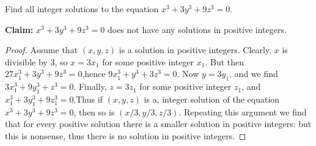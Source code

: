 \documentclass[11pt,dvipsnames]{book}
\numberwithin{equation}{section} %
\numberwithin{figure}{section} %
\numberwithin{table}{section} %
\begin{document}
\begin{exercise} Find all integer solutions to the equation $x^3+3y^3+9z^3= 0$.

\begin{solution}
{\bf Claim:} $x^3+3y^3+9z^3= 0$ does not have any solutions in positive integers.

\begin{proof}
Assume that $(x, y, z)$ is a solution in positive integers. Clearly, $x$ is divisible by $3$, so $x= 3x_1$ for some positive integer $x_1$. But then $27x_{1}^{3}+3y^3+9z^3= 0$,hence $9x_1^3+y^3+3z^3= 0$. Now $y= 3y_1$, and we find $3x_1^3+9y^{3}_{1}+z^3= 0$. Finally, $z= 3z_1$ for some positive integer $z_1$, and $x_{1}^{3}+ 3y_{1}^{3}+ 9z_{1}^{3}= 0$.Thus if $(x, y, z)$ is a, integer solution of the equation $x^3+3y^3+9z^3= 0$, then so is $(x/3,y/3,z/3)$. Repeating this argument we find that for every positive solution there is a smaller solution in positive integers: but this is nonsense, thus there is no solution in positive integers.
\end{proof}
\end{solution}


\end{exercise}

%
%
%
\end{document}
